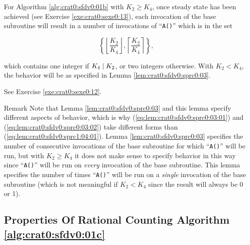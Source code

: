 \begin{vworklemmastatement}
\label{lem:crat0:sfdv0:sprc1:04}
For Algorithm \ref{alg:crat0:sfdv0:01b}
with
$K_2 \geq K_4$, once steady
state has been achieved (see Exercise
\ref{exe:crat0:sexe0:13}), each invocation of the
base subroutine will result in
a number of invocations of
``\texttt{A()}'' which is in the set

\begin{equation}
\label{eq:lem:crat0:sfdv0:sprc1:04:01}
\left\{
\left\lfloor \frac{K_2}{K_4} \right\rfloor ,
\left\lceil  \frac{K_2}{K_4} \right\rceil
\right\},
\end{equation}

which contains one integer if $K_4 \mid K_2$, 
or two integers otherwise.  With $K_2 < K_4$,
the behavior will be as specified in Lemma 
\ref{lem:crat0:sfdv0:sprc0:03}.
\end{vworklemmastatement}
\begin{vworklemmaproof}
See Exercise \ref{exe:crat0:sexe0:12}.
\end{vworklemmaproof}
\begin{vworklemmaparsection}{Remark}
Note that Lemma \ref{lem:crat0:sfdv0:sprc0:03}
and this lemma specify different aspects of behavior,
which is why (\ref{eq:lem:crat0:sfdv0:sprc0:03:01})
and (\ref{eq:lem:crat0:sfdv0:sprc0:03:02}) take
different forms than
(\ref{eq:lem:crat0:sfdv0:sprc1:04:01}).
Lemma \ref{lem:crat0:sfdv0:sprc0:03} specifies the number of consecutive
invocations of the base subroutine for which ``\texttt{A()}''
will be run, but with $K_2 \geq K_4$ it does not make sense to
specify behavior in this way since ``\texttt{A()}'' will be run
on \emph{every} invocation of the base subroutine.  This lemma specifies
the number of times ``\texttt{A()}'' will be run on a \emph{single}
invocation of the base subroutine (which is not meaningful if
$K_2 < K_4$ since the result will always be 0 or 1).
\end{vworklemmaparsection}


\subsection[Properties Of Algorithm \ref{alg:crat0:sfdv0:01c}]
           {Properties Of Rational Counting Algorithm \ref{alg:crat0:sfdv0:01c}}
\label{crat0:sfdv0:sprx0}

